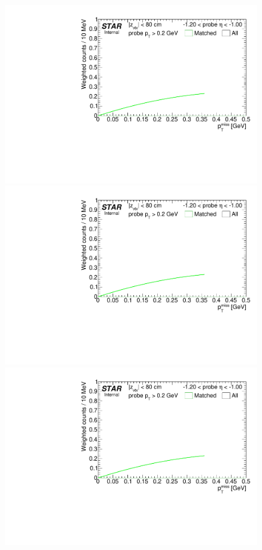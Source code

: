 \begin{figure}
{  \includegraphics[width=\linewidth,page=3]{graphics/correctionsToEff/TOF_tagAndProbe/Fitting_effVsEta_mc.CPT.pdf}\\
  \includegraphics[width=\linewidth,page=4]{graphics/correctionsToEff/TOF_tagAndProbe/Fitting_effVsEta_mc.CPT.pdf}\\
  \includegraphics[width=\linewidth,page=5]{graphics/correctionsToEff/TOF_tagAndProbe/Fitting_effVsEta_mc.CPT.pdf}\\
}%
\end{figure}
